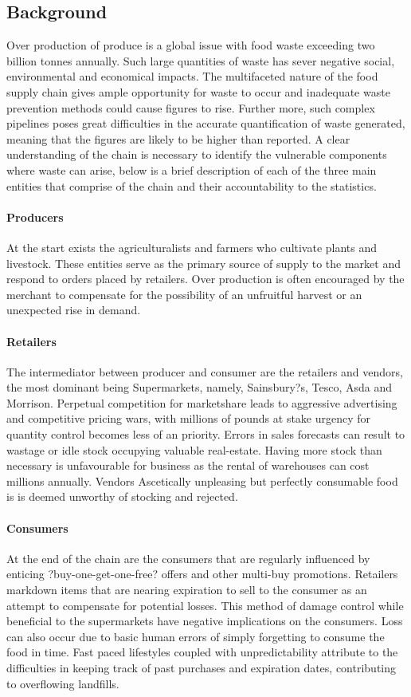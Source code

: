 \documentclass[a4paper, 11pt]{article}
\begin{document}
\subsection{Background}
Over production of produce is a global issue with food waste exceeding two billion tonnes annually. Such large quantities of waste has sever negative social, environmental and economical impacts. The multifaceted nature of the food supply chain gives ample opportunity for waste to occur and inadequate waste prevention methods could cause figures to rise. Further more, such complex pipelines poses great difficulties in the accurate quantification of waste generated, meaning that the figures are likely to be higher than reported. A clear understanding of the chain is necessary to identify the vulnerable components where waste can arise, below is a brief description of each of the three main entities that comprise of the chain and their accountability to the statistics.

\paragraph{Producers}At the start exists the agriculturalists and farmers who cultivate plants and livestock. These entities serve as the primary source of supply to the market and respond to orders placed by retailers. Over production is often encouraged by the merchant to compensate for the possibility of an unfruitful harvest or an unexpected rise in demand. 

\paragraph{Retailers}The intermediator between producer and consumer are the retailers and vendors, the most dominant being Supermarkets, namely, Sainsbury?s, Tesco, Asda and Morrison. Perpetual competition for marketshare leads to aggressive advertising and competitive pricing wars, with millions of pounds at stake urgency for quantity control becomes less of an priority. Errors in sales forecasts can result to wastage or idle stock occupying valuable real-estate. Having more stock than necessary is unfavourable for business as the rental of warehouses can cost millions annually. Vendors Ascetically unpleasing but perfectly consumable food is is deemed unworthy of stocking and rejected.

\paragraph{Consumers}At the end of the chain are the consumers that are regularly influenced by enticing ?buy-one-get-one-free? offers and other multi-buy promotions. Retailers markdown items that are nearing expiration to sell  to the consumer as an attempt to compensate for potential losses. This method of damage control while beneficial to the supermarkets have negative implications on the consumers. Loss can also occur due to basic human errors of simply forgetting to consume the food in time. Fast paced lifestyles coupled with unpredictability attribute to the difficulties in keeping track of past purchases and expiration dates, contributing to overflowing landfills. 
\end{document}
